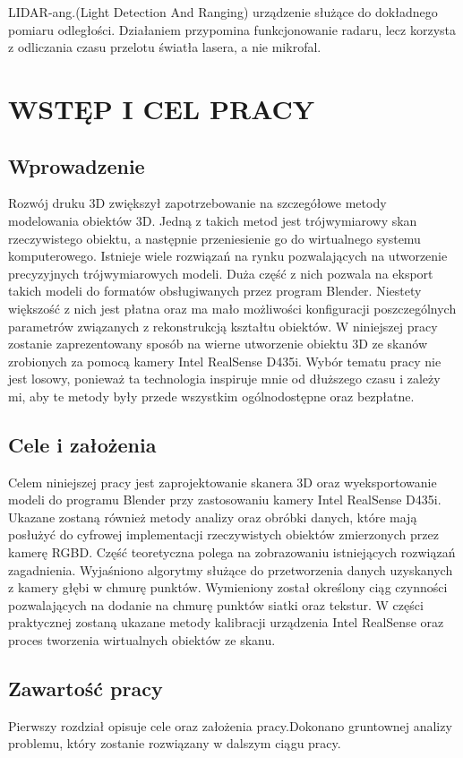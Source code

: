 \documentclass{pginz}
\begin{document}
LIDAR-ang.(Light Detection And Ranging) urządzenie służące do dokładnego pomiaru odległości. Działaniem przypomina funkcjonowanie radaru, lecz korzysta z odliczania czasu przelotu światła lasera, a nie mikrofal.

\chapter{WSTĘP I CEL PRACY}
\section{Wprowadzenie}
Rozwój druku 3D zwiększył zapotrzebowanie na szczegółowe metody modelowania obiektów 3D. Jedną z takich metod jest trójwymiarowy skan rzeczywistego obiektu, a następnie przeniesienie go do wirtualnego systemu komputerowego. Istnieje wiele rozwiązań na rynku pozwalających na utworzenie precyzyjnych trójwymiarowych modeli. Duża część z nich pozwala na eksport takich modeli do formatów obsługiwanych przez program Blender. Niestety większość z nich jest płatna oraz ma mało możliwości konfiguracji poszczególnych parametrów związanych z rekonstrukcją kształtu obiektów. W niniejszej pracy zostanie zaprezentowany sposób na wierne utworzenie obiektu 3D ze skanów zrobionych za pomocą kamery Intel RealSense D435i. Wybór tematu pracy nie jest losowy, ponieważ ta technologia inspiruje mnie od dłuższego czasu i zależy mi, aby te metody były przede wszystkim ogólnodostępne oraz bezpłatne.
\section{Cele i założenia}
Celem niniejszej pracy jest zaprojektowanie skanera 3D oraz wyeksportowanie modeli do programu Blender przy zastosowaniu kamery Intel RealSense D435i.
Ukazane zostaną również metody analizy oraz obróbki danych, które mają posłużyć do cyfrowej implementacji rzeczywistych obiektów zmierzonych przez kamerę RGBD. Część teoretyczna polega na zobrazowaniu istniejących rozwiązań zagadnienia. Wyjaśniono algorytmy służące do przetworzenia danych uzyskanych z kamery głębi w chmurę punktów. Wymieniony został określony ciąg czynności pozwalających na dodanie na chmurę punktów siatki oraz tekstur. W części praktycznej zostaną ukazane metody kalibracji urządzenia Intel RealSense oraz proces tworzenia wirtualnych obiektów ze skanu.
\section{Zawartość pracy}
Pierwszy rozdział opisuje cele oraz założenia pracy.Dokonano gruntownej analizy problemu, który zostanie rozwiązany w dalszym ciągu pracy.
\end{document}
